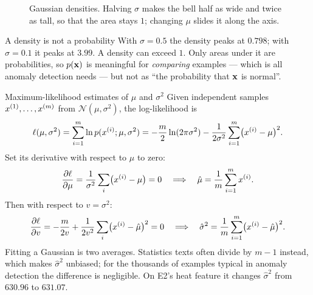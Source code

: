 \begin{figure}[htbp]
  \centering
  \caption{Gaussian densities. Halving $\sigma$ makes the bell half as wide and
  twice as tall, so that the area stays $1$; changing $\mu$ slides it along the
  axis.}
  \label{fig:gaussians}
\end{figure}

\begin{pitfall}{A density is not a probability}
With $\sigma = 0.5$ the density peaks at $0.798$; with $\sigma = 0.1$ it peaks at
$3.99$. A density can exceed $1$. Only areas under it are probabilities, so
$p(\mathbf{x})$ is meaningful for \emph{comparing} examples --- which is all anomaly
detection needs --- but not as ``the probability that $\mathbf{x}$ is normal''.
\end{pitfall}

\begin{derivation}{Maximum-likelihood estimates of $\mu$ and $\sigma^2$}
Given independent samples $x^{(1)},\dots,x^{(m)}$ from $\mathcal{N}(\mu,\sigma^2)$,
the log-likelihood is
\[
  \ell(\mu,\sigma^2) = \sum_{i=1}^{m}\ln p(x^{(i)};\mu,\sigma^2)
  = -\frac m2\ln(2\pi\sigma^2) - \frac{1}{2\sigma^2}\sum_{i=1}^{m}\bigl(x^{(i)} - \mu\bigr)^2 .
\]
Set its derivative with respect to $\mu$ to zero:
\[
  \frac{\partial\ell}{\partial\mu} = \frac{1}{\sigma^2}\sum_{i}\bigl(x^{(i)} - \mu\bigr) = 0
  \quad\Longrightarrow\quad
  \hat\mu = \frac1m\sum_{i=1}^{m}x^{(i)} .
\]
Then with respect to $v = \sigma^2$:
\[
  \frac{\partial\ell}{\partial v} = -\frac{m}{2v} + \frac{1}{2v^2}\sum_i\bigl(x^{(i)} - \hat\mu\bigr)^2 = 0
  \quad\Longrightarrow\quad
  \hat\sigma^2 = \frac1m\sum_{i=1}^{m}\bigl(x^{(i)} - \hat\mu\bigr)^2 .
\]
Fitting a Gaussian is two averages. Statistics texts often divide by $m-1$
instead, which makes $\hat\sigma^2$ unbiased; for the thousands of examples
typical in anomaly detection the difference is negligible. On E2's heat feature
it changes $\hat\sigma^2$ from $630.96$ to $631.07$.
\end{derivation}

